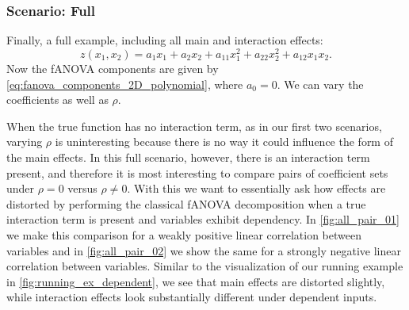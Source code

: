 \subsubsection{Scenario: Full}
Finally, a full example, including all main and interaction effects:
$$z(x_1, x_2) = a_1 x_1 + a_2 x_2 + a_{11} x_1^2 + a_{22} x_2^2 + a_{12} x_1 x_2.$$
Now the fANOVA components are given by \autoref{eq:fanova_components_2D_polynomial}, where $a_0 = 0$.
We can vary the coefficients as well as $\rho$.\par
When the true function has no interaction term, as in our first two scenarios, varying $\rho$ is uninteresting because there is no way it could influence the form of the main effects. In this full scenario, however, there is an interaction term present, and therefore it is most interesting to compare pairs of coefficient sets under $\rho = 0$ versus $\rho \neq 0$. With this we want to essentially ask how effects are distorted by performing the classical fANOVA decomposition when a true interaction term is present and variables exhibit dependency.
In \autoref{fig:all_pair_01} we make this comparison for a weakly positive linear correlation between variables and in \autoref{fig:all_pair_02} we show the same for a strongly negative linear correlation between variables. Similar to the visualization of our running example in \autoref{fig:running_ex_dependent}, we see that main effects are distorted slightly, while interaction effects look substantially different under dependent inputs.

